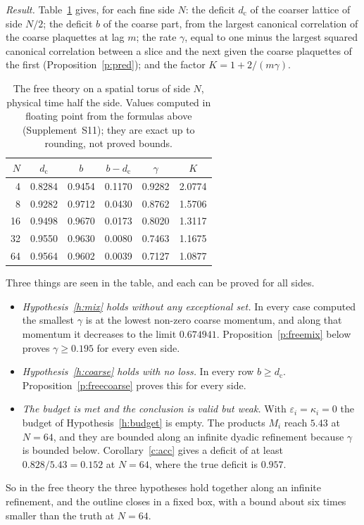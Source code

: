 \emph{Result.} Table~\ref{tab:free} gives, for each fine side $N$: the deficit $d_{\mathrm c}$ of the coarser
lattice of side $N/2$; the deficit $b$ of the coarse part, from the largest canonical correlation of the
coarse plaquettes at lag $m$; the rate $\gamma$, equal to one minus the largest squared canonical correlation
between a slice and the next given the coarse plaquettes of the first (Proposition~\ref{p:pred}); and the
factor $K=1+2/(m\gamma)$.

\begin{table}[htbp]
\caption{The free theory on a spatial torus of side $N$, physical time half the side. Values computed in
floating point from the formulas above (Supplement~S11); they are exact up to rounding, not proved bounds.}\label{tab:free}
\centering\small
\begin{tabular}{@{}rccccc@{}}
\toprule
$N$ & $d_{\mathrm c}$ & $b$ & $b-d_{\mathrm c}$ & $\gamma$ & $K$ \\
\midrule
4 & 0.8284 & 0.9454 & 0.1170 & 0.9282 & 2.0774 \\
8 & 0.9282 & 0.9712 & 0.0430 & 0.8762 & 1.5706 \\
16 & 0.9498 & 0.9670 & 0.0173 & 0.8020 & 1.3117 \\
32 & 0.9550 & 0.9630 & 0.0080 & 0.7463 & 1.1675 \\
64 & 0.9564 & 0.9602 & 0.0039 & 0.7127 & 1.0877 \\
\bottomrule
\end{tabular}
\end{table}

Three things are seen in the table, and each can be proved for all sides.
\begin{itemize}
\item \emph{Hypothesis~\ref{h:mix} holds without any exceptional set.} In every case computed the smallest
$\gamma$ is at the lowest non-zero coarse momentum, and along that momentum it decreases to the limit
$0.674941$.
Proposition~\ref{p:freemix} below proves $\gamma\ge0.195$ for every even side.
\item \emph{Hypothesis~\ref{h:coarse} holds with no loss.} In every row $b\ge d_{\mathrm c}$.
Proposition~\ref{p:freecoarse} proves this for every side.
\item \emph{The budget is met and the conclusion is valid but weak.} With $\varepsilon_i=\kappa_i=0$ the
budget of Hypothesis~\ref{h:budget} is empty. The products $M_i$ reach $5.43$ at $N=64$, and they are bounded
along an infinite dyadic refinement because $\gamma$ is bounded below. Corollary~\ref{c:acc} gives a deficit
of at least $0.828/5.43=0.152$ at $N=64$, where the true deficit is $0.957$.
\end{itemize}
So in the free theory the three hypotheses hold together along an infinite refinement, and the outline
closes in a fixed box, with a bound about six times smaller than the truth at $N=64$.

